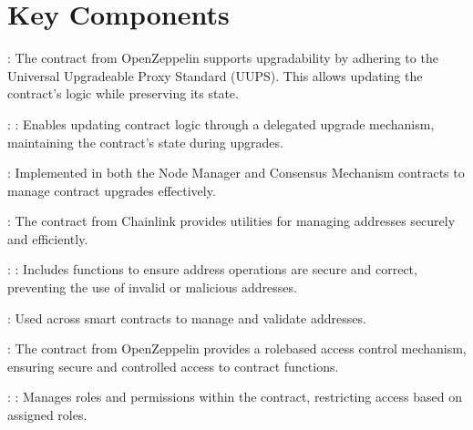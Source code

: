 \documentclass[a4paper,10pt,english]{sphinxmanual}
\let\sphinxpxdimen\pdfpxdimen\else\newdimen\sphinxpxdimen
\begin{document}
\section{Key Components}
\label{\detokenize{docs_upgradable_contract:key-components}}
\sphinxAtStartPar
{}

\sphinxAtStartPar
{}:
The  contract from OpenZeppelin supports upgradability by adhering to the Universal Upgradeable Proxy Standard (UUPS). This allows updating the contract’s logic while preserving its state.

\sphinxAtStartPar
{}:
\sphinxhyphen{} : Enables updating contract logic through a delegated upgrade mechanism, maintaining the contract’s state during upgrades.

\sphinxAtStartPar
{}:
Implemented in both the Node Manager and Consensus Mechanism contracts to manage contract upgrades effectively.

\noindent{\hspace*{\fill}\sphinxincludegraphics[width=600\sphinxpxdimen]{{proxy-contract}.png}\hspace*{\fill}}

\sphinxAtStartPar
{}

\sphinxAtStartPar
{}:
The  contract from Chainlink provides utilities for managing addresses securely and efficiently.

\sphinxAtStartPar
{}:
\sphinxhyphen{} : Includes functions to ensure address operations are secure and correct, preventing the use of invalid or malicious addresses.

\sphinxAtStartPar
{}:
Used across smart contracts to manage and validate addresses.

\sphinxAtStartPar
{}

\sphinxAtStartPar
{}:
The  contract from OpenZeppelin provides a role\sphinxhyphen{}based access control mechanism, ensuring secure and controlled access to contract functions.

\sphinxAtStartPar
{}:
\sphinxhyphen{} : Manages roles and permissions within the contract, restricting access based on assigned roles.
\end{document}
